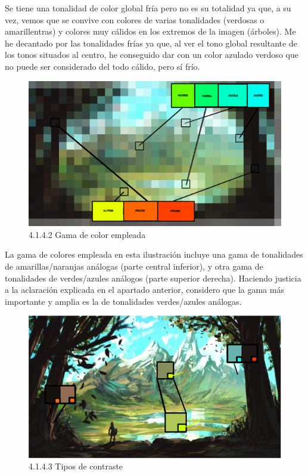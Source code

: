 \documentclass[12pt]{article}
\begin{document}
    Se tiene una tonalidad de color global fría pero no es su totalidad ya que, a su vez, vemos que se convive con colores de varias tonalidades (verdosas o amarillentras) y colores muy cálidos en los extremos de la imagen (árboles). Me he decantado por las tonalidades frías ya que, al ver el tono global resultante de los tonos situados al centro, he conseguido dar con un color azulado verdoso que no puede ser considerado del todo cálido, pero sí frío.

    \begin{figure}[H]
      \centering
      \includegraphics[scale=0.4]{images/Nerea/Nerea Zelda concept 142.PNG}
      \caption{\small 4.1.4.2 Gama de color empleada}
    \end{figure}

    La gama de colores empleada en esta ilustración incluye una gama de tonalidades de amarillas/naranjas análogas (parte central inferior),  y otra gama de tonalidades de verdes/azules análogos (parte superior derecha). Haciendo justicia a la aclaración explicada en el apartado anterior, considero que la gama más importante y amplia es la de tonalidades verdes/azules análogas.

    \begin{figure}[H]
      \centering
      \includegraphics[scale=0.4]{images/Nerea/Nerea Zelda concept 143.PNG}
      \caption{\small 4.1.4.3 Tipos de contraste}
    \end{figure}
\end{document}
